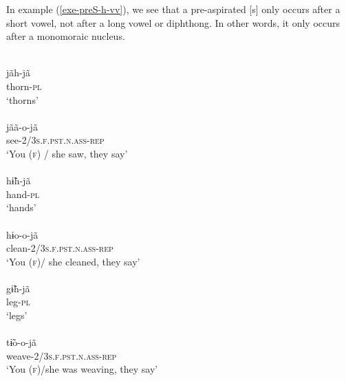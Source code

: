\documentclass[output=paper]{langscibook}
\begin{document}
In example (\ref{exe-preS-h-vv}), we see that a pre-aspirated [s] only occurs after a short vowel, not after a long vowel or diphthong. In other words, it only occurs after a monomoraic nucleus.

\begin{exe}
\ex\label{exe-preLN-h-vv}
\begin{xlist}
\ex
\ea
\glll [ɲãh̃.ɲã]\\
jãh-jã\\
thorn-\textsc{pl}\\
\trans `thorns'\\
{\citep[20120919elicr005]{Bruil:2012}}
\ex
\glll [ɲãõ.ɲã]\\
jãã-o-jã\\
see-\textsc{2/3s.f.pst.n.ass-rep}\\
\trans `You (\textsc{f}) / she saw, they say'\\
{\citep[349]{Bruil:2014}}
\z
\ex
\ea
\glll [{h̃\~ɨh̃.ɲã}]\\
{h\~ɨh-jã}\\
{hand-\textsc{pl}}\\
\trans `hands'\\
{\citep[105]{Bruil:2014}}
\ex
\glll [{hɨo.ɲã}]\\
{hɨo-o-jã}\\
{clean-\textsc{2/3s.f.pst.n.ass-rep}}\\
\trans `You (\textsc{f})/ she cleaned, they say'\\
{\citep[20140524slicr001.309]{Bruil:2012}}
\z
\ex
\ea
\glll [k̰ĩh̃.ɲã]\\
g\~ɨh-jã\\
leg-\textsc{pl}\\
\trans `legs'\\
{\citep[20120919elicr005]{Bruil:2012}}
\ex
\glll [{t\~ɨõ.ɲã}]\\
{t\~ɨo-o-jã}\\
weave-\textsc{2/3s.f.pst.n.ass-rep}\\
\trans `You (\textsc{f})/she was weaving, they say'\\
{\citep[20120918elicr003]{Bruil:2012}}
\z
\end{xlist}
\end{exe}
\end{document}
